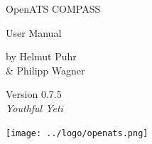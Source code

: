 \documentclass[oneside,a4paper]{memoir}
\begin{document}
\firmlists
\midsloppy
\raggedbottom


%

\frontmatter
\pagestyle{empty}


\vspace*{\fill}
\begin{center}
\HUGE\textsf{OpenATS COMPASS}\par
\end{center}

\begin{center}
\Huge\textsf{User Manual}\par
\end{center}
\begin{center}
\normalsize\textsf{by Helmut Puhr\\ \& Philipp Wagner}\par
\medskip
\normalsize\textsf{Version 0.7.5\\ \textit{Youthful Yeti}} \\ %
\medskip
{}
\end{center}
\vspace*{\fill}
\begin{center}
\texttt{[image: ../logo/openats.png]}
\setlength{\droptitle}{0pt}%
\end{center}
\clearpage

\cleardoublepage

\pagestyle{headings}

\setupshorttoc
\tableofcontents
\clearpage
\setupparasubsecs
\setupmaintoc
\tableofcontents
\setlength{\unitlength}{1pt}
\clearpage
\listoffigures
\clearpage
\listoftables
\clearpage






\end{document}
